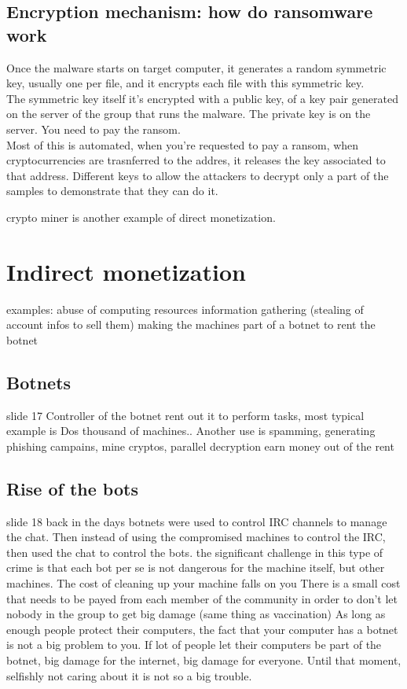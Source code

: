 \iffalse
\subsection{Encryption mechanism: how do ransomware work}
    Once the malware starts on target computer, it generates a random symmetric key, usually one per file, and it encrypts each file with this symmetric key.\\
    The symmetric key itself it's encrypted with a public key, of a key pair generated on the server of the group that runs the malware. The private key is on the server. You need to pay the ransom.
    \\Most of this is automated, when you're requested to pay a ransom, when cryptocurrencies are trasnferred to the addres, it releases the key associated to that address.
    Different keys to allow the attackers to decrypt only a part of the samples to demonstrate that they can do it.

crypto miner is another example of direct monetization.


\section{Indirect monetization}
    examples: abuse of computing resources
    information gathering (stealing of account infos to sell them)
    making the machines part of a botnet to rent the botnet

    \subsection[short]{Botnets}
        slide 17 
        Controller of the botnet rent out it to perform tasks, most typical example is Dos
        thousand of machines..
        Another use is spamming, generating phishing campains, mine cryptos, parallel decryption
        earn money out of the rent

    \subsection{Rise of the bots}
        slide 18
        back in the days botnets were used to control IRC channels to manage the chat.
        Then instead of using the compromised machines to control the IRC, then used the chat to control the bots.
        the significant challenge in this type of crime is that each bot per se is not dangerous for the machine itself, but other machines.
        The cost of cleaning up your machine falls on you 
        There is a small cost that needs to be payed from each member of the community in order to don't let nobody in the group to get big damage
        (same thing as vaccination)
        As long as enough people protect their computers, the fact that your computer has a botnet is not a big problem to you.
        If lot of people let their computers be part of the botnet, big damage for the internet, big damage for everyone.
        Until that moment, selfishly not caring about it is not so a big trouble.

